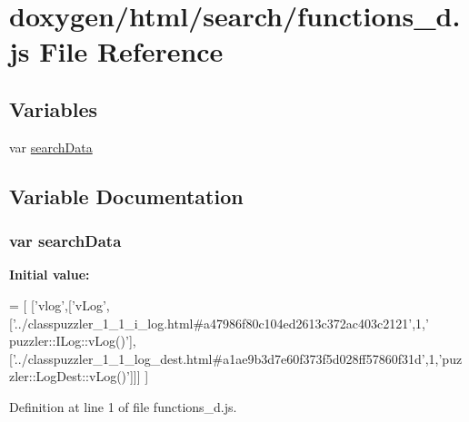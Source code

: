 \hypertarget{a00096}{}\section{doxygen/html/search/functions\+\_\+d.js File Reference}
\label{a00096}
\subsection*{Variables}
\begin{DoxyCompactItemize}
\item 
var \hyperlink{a00096_ad01a7523f103d6242ef9b0451861231e}{search\+Data}
\end{DoxyCompactItemize}


\subsection{Variable Documentation}
\hypertarget{a00096_ad01a7523f103d6242ef9b0451861231e}{}
\subsubsection[{search\+Data}]{\setlength{\rightskip}{0pt plus 5cm}var search\+Data}\label{a00096_ad01a7523f103d6242ef9b0451861231e}
{\bfseries Initial value\+:}
\begin{DoxyCode}
=
[
  [\textcolor{stringliteral}{'vlog'},[\textcolor{stringliteral}{'vLog'},[\textcolor{stringliteral}{'../classpuzzler\_1\_1\_i\_log.html#a47986f80c104ed2613c372ac403c2121'},1,\textcolor{stringliteral}{'
      puzzler::ILog::vLog()'}],[\textcolor{stringliteral}{'../classpuzzler\_1\_1\_log\_dest.html#a1ae9b3d7e60f373f5d028ff57860f31d'},1,\textcolor{stringliteral}{'puzzler::LogDest::vLog()'}]]]
]
\end{DoxyCode}


Definition at line 1 of file functions\+\_\+d.\+js.

